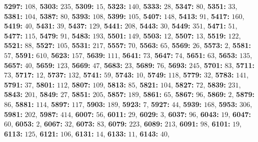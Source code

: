 \textsf{\bfseries 5297:} $108$, \textsf{\bfseries 5303:} $235$, \textsf{\bfseries 5309:} $15$, \textsf{\bfseries 5323:} $140$, \textsf{\bfseries 5333:} $28$, \textsf{\bfseries 5347:} $80$, \textsf{\bfseries 5351:} $33$, \textsf{\bfseries 5381:} $104$, \textsf{\bfseries 5387:} $80$, \textsf{\bfseries 5393:} $108$, \textsf{\bfseries 5399:} $105$, \textsf{\bfseries 5407:} $148$, \textsf{\bfseries 5413:} $91$, \textsf{\bfseries 5417:} $160$, \textsf{\bfseries 5419:} $40$, \textsf{\bfseries 5431:} $39$, \textsf{\bfseries 5437:} $129$, \textsf{\bfseries 5441:} $208$, \textsf{\bfseries 5443:} $30$, \textsf{\bfseries 5449:} $351$, \textsf{\bfseries 5471:} $51$, \textsf{\bfseries 5477:} $115$, \textsf{\bfseries 5479:} $91$, \textsf{\bfseries 5483:} $193$, \textsf{\bfseries 5501:} $149$, \textsf{\bfseries 5503:} $12$, \textsf{\bfseries 5507:} $13$, \textsf{\bfseries 5519:} $122$, \textsf{\bfseries 5521:} $88$, \textsf{\bfseries 5527:} $105$, \textsf{\bfseries 5531:} $217$, \textsf{\bfseries 5557:} $70$, \textsf{\bfseries 5563:} $65$, \textsf{\bfseries 5569:} $26$, \textsf{\bfseries 5573:} $2$, \textsf{\bfseries 5581:} $57$, \textsf{\bfseries 5591:} $610$, \textsf{\bfseries 5623:} $157$, \textsf{\bfseries 5639:} $111$, \textsf{\bfseries 5641:} $73$, \textsf{\bfseries 5647:} $74$, \textsf{\bfseries 5651:} $63$, \textsf{\bfseries 5653:} $135$, \textsf{\bfseries 5657:} $40$, \textsf{\bfseries 5659:} $123$, \textsf{\bfseries 5669:} $47$, \textsf{\bfseries 5683:} $23$, \textsf{\bfseries 5689:} $76$, \textsf{\bfseries 5693:} $245$, \textsf{\bfseries 5701:} $83$, \textsf{\bfseries 5711:} $73$, \textsf{\bfseries 5717:} $12$, \textsf{\bfseries 5737:} $132$, \textsf{\bfseries 5741:} $59$, \textsf{\bfseries 5743:} $10$, \textsf{\bfseries 5749:} $118$, \textsf{\bfseries 5779:} $32$, \textsf{\bfseries 5783:} $141$, \textsf{\bfseries 5791:} $37$, \textsf{\bfseries 5801:} $112$, \textsf{\bfseries 5807:} $109$, \textsf{\bfseries 5813:} $85$, \textsf{\bfseries 5821:} $104$, \textsf{\bfseries 5827:} $72$, \textsf{\bfseries 5839:} $231$, \textsf{\bfseries 5843:} $201$, \textsf{\bfseries 5849:} $27$, \textsf{\bfseries 5851:} $205$, \textsf{\bfseries 5857:} $189$, \textsf{\bfseries 5861:} $65$, \textsf{\bfseries 5867:} $96$, \textsf{\bfseries 5869:} $2$, \textsf{\bfseries 5879:} $86$, \textsf{\bfseries 5881:} $114$, \textsf{\bfseries 5897:} $117$, \textsf{\bfseries 5903:} $189$, \textsf{\bfseries 5923:} $7$, \textsf{\bfseries 5927:} $44$, \textsf{\bfseries 5939:} $168$, \textsf{\bfseries 5953:} $306$, \textsf{\bfseries 5981:} $202$, \textsf{\bfseries 5987:} $414$, \textsf{\bfseries 6007:} $56$, \textsf{\bfseries 6011:} $29$, \textsf{\bfseries 6029:} $3$, \textsf{\bfseries 6037:} $96$, \textsf{\bfseries 6043:} $19$, \textsf{\bfseries 6047:} $60$, \textsf{\bfseries 6053:} $2$, \textsf{\bfseries 6067:} $32$, \textsf{\bfseries 6073:} $83$, \textsf{\bfseries 6079:} $223$, \textsf{\bfseries 6089:} $213$, \textsf{\bfseries 6091:} $98$, \textsf{\bfseries 6101:} $19$, \textsf{\bfseries 6113:} $125$, \textsf{\bfseries 6121:} $106$, \textsf{\bfseries 6131:} $14$, \textsf{\bfseries 6133:} $11$, \textsf{\bfseries 6143:} $40$, 
